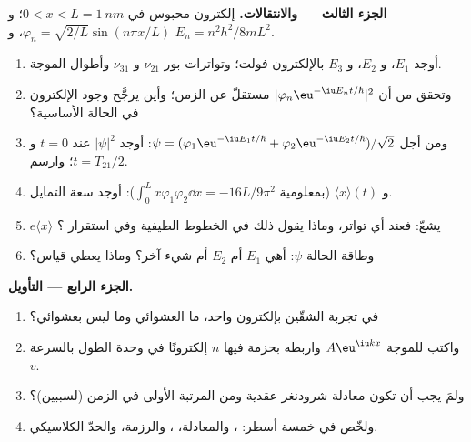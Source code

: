 \begin{problem}
\textbf{الجزء الثالث ---  والانتقالات.}
إلكترون محبوس في $0 < x < L = \qty{1}{nm}$؛ و $\varphi_n =
\sqrt{2/L}\sin(n\pi x/L)$، و $E_n = n^2h^2/8mL^2$.
\begin{enumerate}[resume]
  \item أوجد $E_1$، و $E_2$، و $E_3$ بالإلكترون فولت؛ وتواترات بور
        $\nu_{21}$ و $\nu_{31}$ وأطوال الموجة.
  \item وتحقق من أن $|\varphi_n\eu^{-\iu E_nt/\hbar}|^2$ مستقلّ عن الزمن؛
        وأين يرجَّح وجود الإلكترون في الحالة الأساسية؟
  \item ومن أجل $\psi = (\varphi_1\eu^{-\iu E_1t/\hbar} + \varphi_2\eu^{-\iu E_2t/\hbar})/
        \sqrt2$: أوجد $|\psi|^2$ عند $t = 0$ و $t = T_{21}/2$؛ وارسم.
  \item و $\langle x\rangle(t)$ (بمعلومية $\int_0^Lx\varphi_1\varphi_2\dd x = -16L/9\pi^2$):
        أوجد سعة التمايل.
  \item {} $e\langle x\rangle$ يشعّ: فعند أي
        تواتر، وماذا يقول ذلك في الخطوط الطيفية وفي
        استقرار ؟
  \item وطاقة الحالة $\psi$: أهي $E_1$ أم $E_2$ أم شيء
        آخر؟ وماذا يعطي قياس؟
\end{enumerate}

\textbf{الجزء الرابع --- التأويل.}
\begin{enumerate}[resume]
  \item في تجربة الشقّين بإلكترون واحد، ما العشوائي
        وما ليس بعشوائي؟
  \item واكتب  للموجة $A\eu^{\iu kx}$ واربطه
        بحزمة فيها $n$ إلكترونًا في وحدة الطول بالسرعة $v$.
  \item ولمَ يجب أن تكون معادلة شرودنغر عقدية ومن المرتبة الأولى
        في الزمن (لسببين)؟
  \item ولخّص في خمسة أسطر: ، والمعادلة،
        ، والرزمة، والحدّ الكلاسيكي.
\end{enumerate}
\end{problem}
